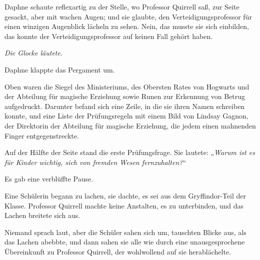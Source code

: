 Daphne schaute reflexartig zu der Stelle, wo Professor Quirrell saß, zur Seite gesackt, aber mit wachen Augen; und sie glaubte, den Verteidigungsprofessor für einen winzigen Augenblick lächeln zu sehen. Nein, das musste sie sich einbilden, das konnte der Verteidigungsprofessor auf keinen Fall gehört haben.

\emph{Die Glocke läutete.}

Daphne klappte das Pergament um.

Oben waren die Siegel des Ministeriums, des Obersten Rates von Hogwarts und der Abteilung für magische Erziehung sowie Runen zur Erkennung von Betrug aufgedruckt. Darunter befand sich eine Zeile, in die sie ihren Namen schreiben konnte, und eine Liste der Prüfungsregeln mit einem Bild von Lindsay Gagnon, der Direktorin der Abteilung für magische Erziehung, die jedem einen mahnenden Finger entgegenstreckte.

Auf der Hälfte der Seite stand die erste Prüfungsfrage. Sie lautete:
%
„\emph{Warum ist es für Kinder wichtig, sich von fremden Wesen fernzuhalten?}“

Es gab eine verblüffte Pause.

Eine Schülerin begann zu lachen, sie dachte, es sei aus dem Gryffindor-Teil der Klasse. Professor Quirrell machte keine Anstalten, es zu unterbinden, und das Lachen breitete sich aus.

Niemand sprach laut, aber die Schüler sahen sich um, tauschten Blicke aus, als das Lachen abebbte, und dann sahen sie alle wie durch eine unausgesprochene Übereinkunft zu Professor Quirrell, der wohlwollend auf sie herablächelte.

